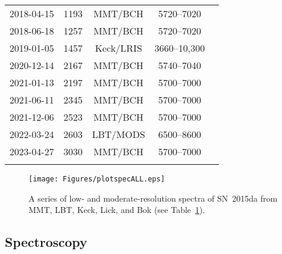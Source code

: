 \documentclass[fleqn,usenatbib,useAMS]{mnras}
\begin{document}
\begin{table}
\begin{center}
\begin{minipage}{3.25in}
\begin{tabular}{@{}ccccc}
2018-04-15 &1193 &MMT/BCH   &5720--7020 \\
2018-06-18 &1257 &MMT/BCH   &5720--7020 \\
2019-01-05 &1457 &Keck/LRIS &3660--10,300 \\
2020-12-14 &2167 &MMT/BCH   &5740--7040 \\
2021-01-13 &2197 &MMT/BCH   &5700--7000 \\
2021-06-11 &2345 &MMT/BCH   &5700--7000 \\
2021-12-06 &2523 &MMT/BCH   &5700--7000 \\
2022-03-24 &2603 &LBT/MODS  &6500--8600 \\
2023-04-27 &3030 &MMT/BCH   &5700--7000 \\
\hline \\
\end{tabular}
\label{tab:spectra}
\end{minipage}\end{center}
\end{table}



\begin{figure}
\texttt{[image: Figures/plotspecALL.eps]}
\caption{A series of low- and moderate-resolution spectra of SN~2015da from MMT, LBT, Keck, Lick, and Bok (see Table~\ref{tab:spectra}).}
\label{fig:spectra}
\end{figure}



\subsection{Spectroscopy} \label{obs:spec}
\end{document}
